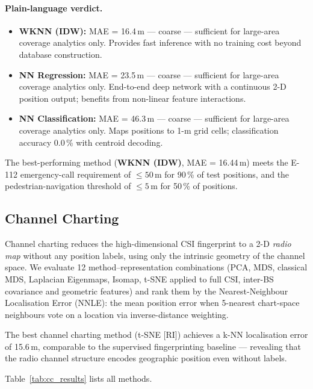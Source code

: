 \paragraph{Plain-language verdict.}
\begin{itemize}
  \item \textbf{WKNN (IDW):} MAE = 16.4\,m — coarse — sufficient for large-area coverage analytics only.
        Provides fast inference with no training cost beyond database construction.
  \item \textbf{NN Regression:} MAE = 23.5\,m — coarse — sufficient for large-area coverage analytics only.
        End-to-end deep network with a continuous 2-D position output; benefits
        from non-linear feature interactions.
  \item \textbf{NN Classification:} MAE = 46.3\,m — coarse — sufficient for large-area coverage analytics only.
        Maps positions to 1-m grid cells; classification accuracy
        0.0\,\% with centroid decoding.
\end{itemize}
The best-performing method (\textbf{WKNN (IDW)}, MAE = 16.44\,m)
meets the E-112 emergency-call requirement of $\leq 50\,\text{m}$ for
90\,\% of test positions, and the pedestrian-navigation
threshold of $\leq 5\,\text{m}$ for 50\,\% of positions.

\subsection{Channel Charting}
\label{sec:cc_results}

Channel charting reduces the high-dimensional CSI fingerprint to a
2-D \emph{radio map} without any position labels, using only the
intrinsic geometry of the channel space.  We evaluate 12
method--representation combinations (PCA, MDS, classical MDS, Laplacian
Eigenmaps, Isomap, t-SNE applied to full CSI, inter-BS covariance and
geometric features) and rank them by the Nearest-Neighbour Localisation
Error (NNLE): the mean position error when 5-nearest chart-space neighbours
vote on a location via inverse-distance weighting.

The best channel charting method (t-SNE [RI]) achieves a k-NN localisation error of 15.6\,m, comparable to the supervised fingerprinting baseline — revealing that the radio channel structure encodes geographic position even without labels.

Table~\ref{tab:cc_results} lists all methods.

